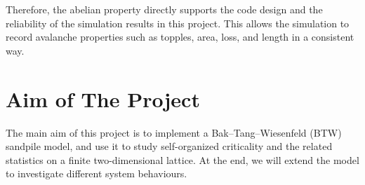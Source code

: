 Therefore, the abelian property directly supports the code design and the reliability of the simulation results in this project. This allows the simulation to record avalanche properties such as topples, area, loss, and length in a consistent way. 



\section{Aim of The Project}

The main aim of this project is to implement a Bak--Tang--Wiesenfeld (BTW) sandpile model, and use it to study self-organized criticality and the related statistics on a finite two-dimensional lattice. At the end, we will extend the model to investigate different system behaviours. 